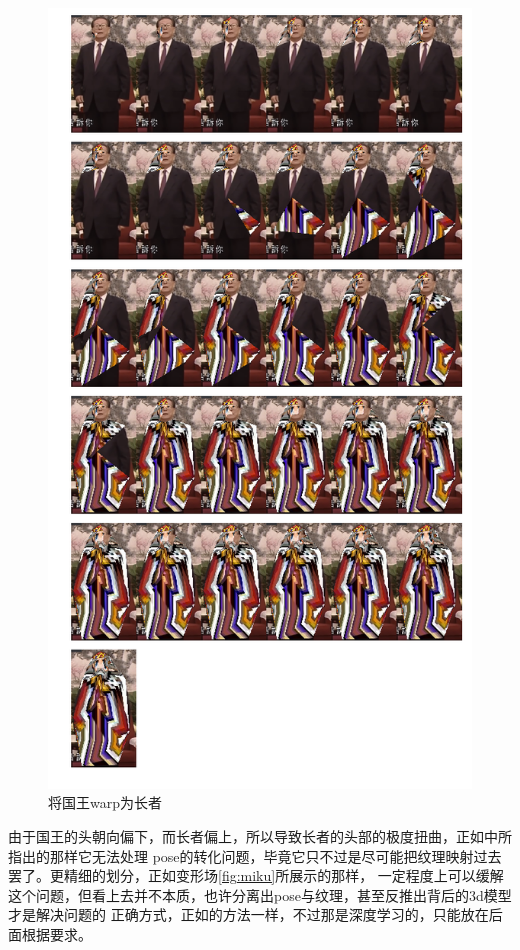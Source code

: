 \documentclass[twocolumn,11pt]{ctexart}
\begin{document}
\begin{figure}[htb]
    \includegraphics[width=\linewidth]{tri_king2elder.png}
    \caption{将国王warp为长者}
    \label{fig:king2elder}
\end{figure}

由于国王的头朝向偏下，而长者偏上，所以导致长者的头部的极度扭曲，正如\cite{swapface}中所指出的那样它无法处理
pose的转化问题，毕竟它只不过是尽可能把纹理映射过去罢了。更精细的划分，正如变形场\ref{fig:miku}所展示的那样，
一定程度上可以缓解这个问题，但看上去并不本质，也许分离出pose与纹理，甚至反推出背后的3d模型才是解决问题的
正确方式，正如\cite{yingzhen2018disentangled}的方法一样，不过那是深度学习的，只能放在后面根据要求。
\end{document}
